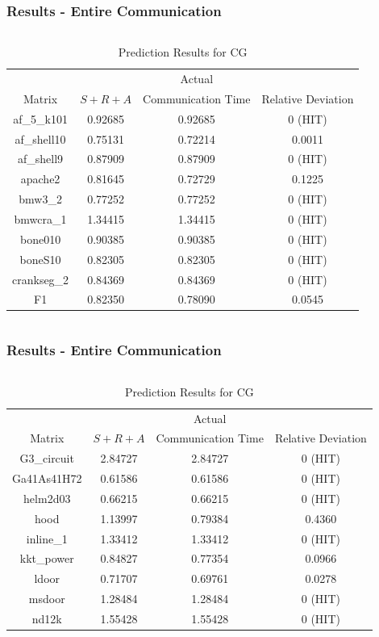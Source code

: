 \documentclass{beamer}
\begin{document}
\begin{frame}
\frametitle{Results - Entire Communication}
\begin{columns}[c]

\begin{table}[h!]
\centering
\caption{Prediction Results for CG}
\begin{tabular}{|c|c|c|c|}
\hline
 & & Actual& \\
Matrix & $S+R+A$ &Communication Time & Relative Deviation \\
\hline
af\_5\_k101 & 0.92685 & 0.92685 & 0 (HIT) \\
af\_shell10 & 0.75131 & 0.72214 & 0.0011 \\
af\_shell9 & 0.87909 & 0.87909 & 0 (HIT) \\
apache2 & 0.81645 & 0.72729 & 0.1225\\
bmw3\_2 & 0.77252 & 0.77252 & 0 (HIT) \\
bmwcra\_1 & 1.34415 & 1.34415 & 0 (HIT) \\
bone010 & 0.90385 & 0.90385 & 0 (HIT) \\
boneS10 & 0.82305 & 0.82305 & 0 (HIT) \\
crankseg\_2 & 0.84369 & 0.84369 & 0 (HIT) \\
F1 & 0.82350 & 0.78090 & 0.0545 \\
\hline
\end{tabular}
\end{table}
\end{columns}
\end{frame}

\begin{frame}
\frametitle{Results - Entire Communication}
\begin{columns}[c]

\begin{table}[h!]
\centering
\caption{Prediction Results for CG}
\begin{tabular}{|c|c|c|c|}
\hline
 & & Actual& \\
Matrix & $S+R+A$ &Communication Time & Relative Deviation \\
\hline
G3\_circuit & 2.84727 & 2.84727 & 0 (HIT) \\
Ga41As41H72 & 0.61586 & 0.61586 & 0 (HIT) \\
helm2d03 & 0.66215 & 0.66215 & 0 (HIT) \\
hood & 1.13997 & 0.79384 & 0.4360 \\
inline\_1 & 1.33412 & 1.33412 & 0 (HIT) \\
kkt\_power & 0.84827 & 0.77354 & 0.0966 \\
ldoor & 0.71707 & 0.69761 & 0.0278 \\
msdoor & 1.28484 & 1.28484 & 0 (HIT) \\
nd12k & 1.55428 & 1.55428 & 0 (HIT) \\
\hline
\end{tabular}
\end{table}
\end{columns}
\end{frame}
\end{document}
